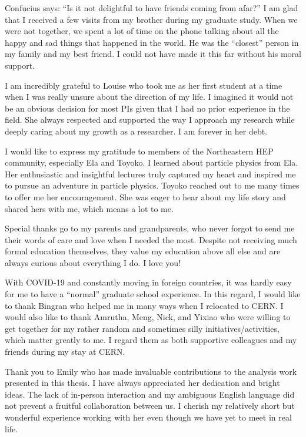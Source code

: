 \begin{acknowledgments}

Confucius says: ``Is it not delightful to have friends coming from afar?'' I am glad that I received a few visits from my brother during my graduate study. When we were not together, we spent a lot of time on the phone talking about all the happy and sad things that happened in the world. He was the ``closest'' person in my family and my best friend. I could not have made it this far without his moral support.

I am incredibly grateful to Louise who took me as her first student at a time when I was really unsure about the direction of my life. I imagined it would not be an obvious decision for most PIs given that I had no prior experience in the field. She always respected and supported the way I approach my research while deeply caring about my growth as a researcher. I am forever in her debt.  

I would like to express my gratitude to members of the Northeastern HEP community, especially Ela and Toyoko. I learned about particle physics from Ela. Her enthusiastic and insightful lectures truly captured my heart and inspired me to pursue an adventure in particle physics. Toyoko reached out to me many times to offer me her encouragement. She was eager to hear about my life story and shared hers with me, which means a lot to me.

Special thanks go to my parents and grandparents, who never forgot to send me their words of care and love when I needed the most. Despite not receiving much formal education themselves, they value my education above all else and are always curious about everything I do. I love you!

With COVID-19 and constantly moving in foreign countries, it was hardly easy for me to have a ``normal'' graduate school experience. In this regard, I would like to thank Bingran who helped me in many ways when I relocated to CERN. I would also like to thank Amrutha, Meng, Nick, and Yixiao who were willing to get together for my rather random and sometimes silly initiatives/activities, which matter greatly to me. I regard them as both supportive colleagues and my friends during my stay at CERN.

Thank you to Emily who has made invaluable contributions to the analysis work presented in this thesis. I have always appreciated her dedication and bright ideas. The lack of in-person interaction and my ambiguous English language did not prevent a fruitful collaboration between us. I cherish my relatively short but wonderful experience working with her even though we have yet to meet in real life.

\end{acknowledgments}